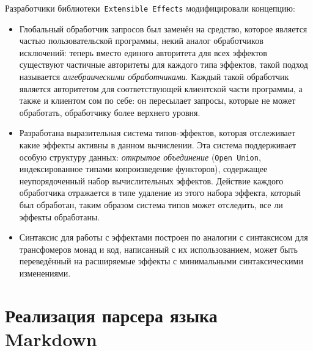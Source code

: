 Разработчики библиотеки~\lstinline{Extensible Effects} модифицировали концепцию: 

\begin{itemize}
  \item 
Глобальный обработчик запросов был заменён на средство, которое является частью пользовательской программы, некий аналог обработчиков исключений: теперь вместо единого авторитета для всех эффектов существуют частичные авторитеты для каждого типа эффектов, такой подход называется \emph{алгебраическими обработчиками}. Каждый такой обработчик является авторитетом для соответствующей клиентской части программы, а также и клиентом сом по себе: он пересылает запросы, которые не может обработать, обработчику более верхнего уровня. 
  \item 
Разработана выразительная система типов-эффектов, которая отслеживает какие эффекты активны в данном вычислении. Эта система поддерживает особую структуру данных: \emph{открытое объединение} (\lstinline{Open Union}, индексированное типами копроизведение функторов), содержащее неупорядоченный набор вычислительных эффектов. Действие каждого обработчика отражается в типе удаление из этого набора эффекта, который был обработан, таким образом система типов может отследить, все ли эффекты обработаны. 
  \item 
Синтаксис для работы с эффектами построен по аналогии с синтаксисом для трансфомеров монад и код, написанный с их использованием, может быть переведённый на расширяемые эффекты с минимальными синтаксическими изменениями.  
\end{itemize} 






\section{Реализация парсера языка Markdown} 

\printbibliography[heading=bibintoc%
]


